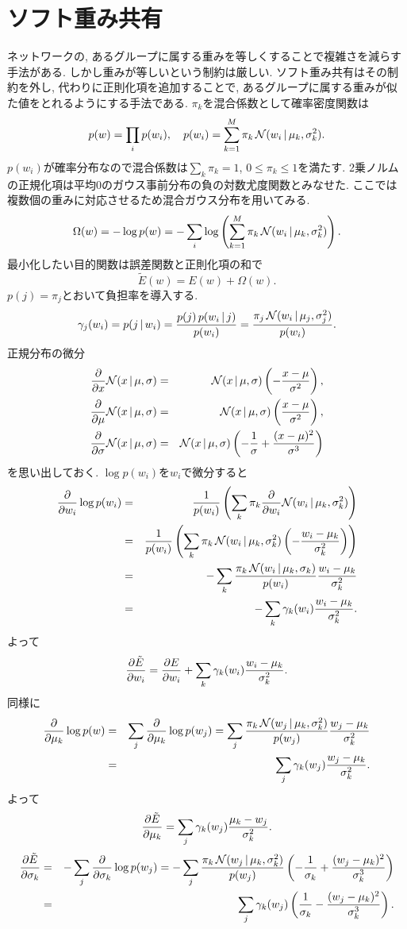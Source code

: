 \section{ソフト重み共有}
ネットワークの, あるグループに属する重みを等しくすることで複雑さを減らす手法がある.
しかし重みが等しいという制約は厳しい.
ソフト重み共有はその制約を外し, 代わりに正則化項を追加することで,
あるグループに属する重みが似た値をとれるようにする手法である.
$\pi_k$を混合係数として確率密度関数は
$$
p(w)=\prod_i p(w_i), \quad p(w_i)=\sum_{k=1}^M \pi_k\, \calN(w_i\,|\,\mu_k,\sigma_k^2).
$$
$p(w_i)$が確率分布なので混合係数は$\sum_k \pi_k=1$, $0 \le \pi_k \le 1$を満たす.
2乗ノルムの正規化項は平均$0$のガウス事前分布の負の対数尤度関数とみなせた.
ここでは複数個の重みに対応させるため混合ガウス分布を用いてみる.
$$
\Omega(w)=-\log p(w)=-\sum_i\log\left(\sum_{k=1}^M \pi_k\, \calN(w_i\,|\,\mu_k,\sigma_k^2)\right).
$$
最小化したい目的関数は誤差関数と正則化項の和で
$$
\tilde{E}(w)=E(w)+\Omega(w).
$$
$p(j)=\pi_j$とおいて負担率を導入する.
$$
\gamma_j(w_i)
 =p(j\,|\,w_i)
 =\frac{p(j)\,p(w_i\,|\,j)}{p(w_i)}=
 \frac{\pi_j\, \calN(w_i\,|\,\mu_j,\sigma_j^2)}{p(w_i)}.
$$
正規分布の微分
\begin{eqnarray*}
\dif{x}\calN(x\,|\,\mu,\sigma)&=&\calN(x\,|\,\mu,\sigma)\left(-\frac{x-\mu}{\sigma^2}\right),\\
\dif{\mu}\calN(x\,|\,\mu,\sigma)&=&\calN(x\,|\,\mu,\sigma)\left(\frac{x-\mu}{\sigma^2}\right),\\
\dif{\sigma}\calN(x\,|\,\mu,\sigma)&=&\calN(x\,|\,\mu,\sigma)\left(-\frac{1}{\sigma}+\frac{(x-\mu)^2}{\sigma^3}\right)
\end{eqnarray*}
を思い出しておく.
$\log p(w_i)$を$w_i$で微分すると
\begin{eqnarray*}
\dif{w_i}\log p(w_i)
 &=& \frac{1}{p(w_i)} \left(\sum_k \pi_k \dif{w_i} \calN(w_i\,|\,\mu_k,\sigma_k^2)\right)\\
 &=& \frac{1}{p(w_i)} \left(\sum_k \pi_k\, \calN(w_i\,|\,\mu_k,\sigma_k^2) \left(-\frac{w_i-\mu_k}{\sigma_k^2}\right)\right)\\
 &=&-\sum_k \frac{\pi_k\, \calN(w_i\,|\,\mu_k,\sigma_k)}{p(w_i)}\frac{w_i-\mu_k}{\sigma_k^2}\\
 &=&-\sum_k \gamma_k(w_i)\frac{w_i-\mu_k}{\sigma_k^2}.
\end{eqnarray*}
よって
$$
\diff{w_i}{\tilde{E}}=\diff{w_i}{E}+\sum_k \gamma_k(w_i)\frac{w_i-\mu_k}{\sigma_k^2}.
$$
同様に
\begin{eqnarray*}
\dif{\mu_k}\log p(w)
 &=&\sum_j \dif{\mu_k}\log p(w_j)
  =\sum_j \frac{\pi_k\, \calN(w_j\,|\,\mu_k,\sigma_k^2)}{p(w_j)}\frac{w_j-\mu_k}{\sigma_k^2}\\
 &=&\sum_j \gamma_k(w_j)\frac{w_j-\mu_k}{\sigma_k^2}.
\end{eqnarray*}
よって
$$
\diff{\mu_k}{\tilde{E}}=\sum_j \gamma_k(w_j)\frac{\mu_k-w_j}{\sigma_k^2}.
$$
\begin{eqnarray*}
\diff{\sigma_k}{\tilde{E}}
 &=&-\sum_j \dif{\sigma_k}\log p(w_j)
  =-\sum_j \frac{\pi_k\, \calN(w_j\,|\,\mu_k,\sigma_k^2)}{p(w_j)}
    \left(-\frac{1}{\sigma_k}+\frac{(w_j-\mu_k)^2}{\sigma_k^3}\right)\\
 &=&\sum_j \gamma_k(w_j)\left(\frac{1}{\sigma_k}-\frac{(w_j-\mu_k)^2}{\sigma_k^3}\right).
\end{eqnarray*}

